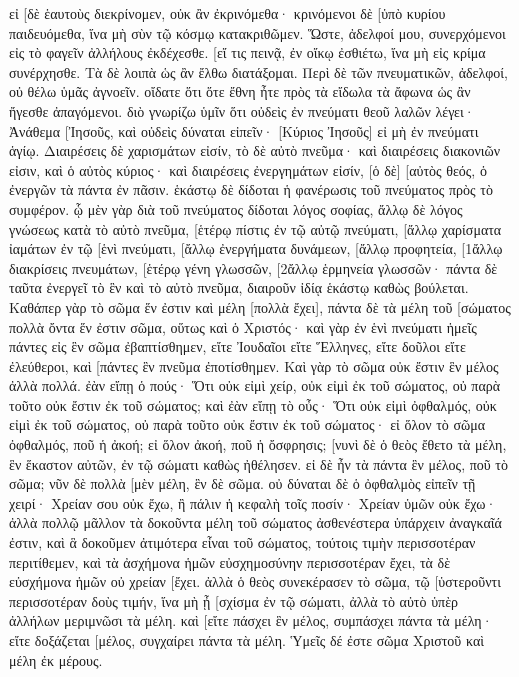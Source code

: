 εἰ [δὲ ἑαυτοὺς διεκρίνομεν, οὐκ ἂν ἐκρινόμεθα· 
κρινόμενοι δὲ [ὑπὸ κυρίου παιδευόμεθα, ἵνα μὴ σὺν τῷ κόσμῳ κατακριθῶμεν. 
Ὥστε, ἀδελφοί μου, συνερχόμενοι εἰς τὸ φαγεῖν ἀλλήλους ἐκδέχεσθε. 
[εἴ τις πεινᾷ, ἐν οἴκῳ ἐσθιέτω, ἵνα μὴ εἰς κρίμα συνέρχησθε. Τὰ δὲ λοιπὰ ὡς ἂν ἔλθω διατάξομαι. 
Περὶ δὲ τῶν πνευματικῶν, ἀδελφοί, οὐ θέλω ὑμᾶς ἀγνοεῖν. 
οἴδατε ὅτι ὅτε ἔθνη ἦτε πρὸς τὰ εἴδωλα τὰ ἄφωνα ὡς ἂν ἤγεσθε ἀπαγόμενοι. 
διὸ γνωρίζω ὑμῖν ὅτι οὐδεὶς ἐν πνεύματι θεοῦ λαλῶν λέγει· Ἀνάθεμα [Ἰησοῦς, καὶ οὐδεὶς δύναται εἰπεῖν· [Κύριος Ἰησοῦς] εἰ μὴ ἐν πνεύματι ἁγίῳ. 
Διαιρέσεις δὲ χαρισμάτων εἰσίν, τὸ δὲ αὐτὸ πνεῦμα· 
καὶ διαιρέσεις διακονιῶν εἰσιν, καὶ ὁ αὐτὸς κύριος· 
καὶ διαιρέσεις ἐνεργημάτων εἰσίν, [ὁ δὲ] [αὐτὸς θεός, ὁ ἐνεργῶν τὰ πάντα ἐν πᾶσιν. 
ἑκάστῳ δὲ δίδοται ἡ φανέρωσις τοῦ πνεύματος πρὸς τὸ συμφέρον. 
ᾧ μὲν γὰρ διὰ τοῦ πνεύματος δίδοται λόγος σοφίας, ἄλλῳ δὲ λόγος γνώσεως κατὰ τὸ αὐτὸ πνεῦμα, 
[ἑτέρῳ πίστις ἐν τῷ αὐτῷ πνεύματι, [ἄλλῳ χαρίσματα ἰαμάτων ἐν τῷ [ἑνὶ πνεύματι, 
[ἄλλῳ ἐνεργήματα δυνάμεων, [ἄλλῳ προφητεία, [1ἄλλῳ διακρίσεις πνευμάτων, [ἑτέρῳ γένη γλωσσῶν, [2ἄλλῳ ἑρμηνεία γλωσσῶν· 
πάντα δὲ ταῦτα ἐνεργεῖ τὸ ἓν καὶ τὸ αὐτὸ πνεῦμα, διαιροῦν ἰδίᾳ ἑκάστῳ καθὼς βούλεται. 
Καθάπερ γὰρ τὸ σῶμα ἕν ἐστιν καὶ μέλη [πολλὰ ἔχει], πάντα δὲ τὰ μέλη τοῦ [σώματος πολλὰ ὄντα ἕν ἐστιν σῶμα, οὕτως καὶ ὁ Χριστός· 
καὶ γὰρ ἐν ἑνὶ πνεύματι ἡμεῖς πάντες εἰς ἓν σῶμα ἐβαπτίσθημεν, εἴτε Ἰουδαῖοι εἴτε Ἕλληνες, εἴτε δοῦλοι εἴτε ἐλεύθεροι, καὶ [πάντες ἓν πνεῦμα ἐποτίσθημεν. 
Καὶ γὰρ τὸ σῶμα οὐκ ἔστιν ἓν μέλος ἀλλὰ πολλά. 
ἐὰν εἴπῃ ὁ πούς· Ὅτι οὐκ εἰμὶ χείρ, οὐκ εἰμὶ ἐκ τοῦ σώματος, οὐ παρὰ τοῦτο οὐκ ἔστιν ἐκ τοῦ σώματος; 
καὶ ἐὰν εἴπῃ τὸ οὖς· Ὅτι οὐκ εἰμὶ ὀφθαλμός, οὐκ εἰμὶ ἐκ τοῦ σώματος, οὐ παρὰ τοῦτο οὐκ ἔστιν ἐκ τοῦ σώματος· 
εἰ ὅλον τὸ σῶμα ὀφθαλμός, ποῦ ἡ ἀκοή; εἰ ὅλον ἀκοή, ποῦ ἡ ὄσφρησις; 
[νυνὶ δὲ ὁ θεὸς ἔθετο τὰ μέλη, ἓν ἕκαστον αὐτῶν, ἐν τῷ σώματι καθὼς ἠθέλησεν. 
εἰ δὲ ἦν τὰ πάντα ἓν μέλος, ποῦ τὸ σῶμα; 
νῦν δὲ πολλὰ [μὲν μέλη, ἓν δὲ σῶμα. 
οὐ δύναται δὲ ὁ ὀφθαλμὸς εἰπεῖν τῇ χειρί· Χρείαν σου οὐκ ἔχω, ἢ πάλιν ἡ κεφαλὴ τοῖς ποσίν· Χρείαν ὑμῶν οὐκ ἔχω· 
ἀλλὰ πολλῷ μᾶλλον τὰ δοκοῦντα μέλη τοῦ σώματος ἀσθενέστερα ὑπάρχειν ἀναγκαῖά ἐστιν, 
καὶ ἃ δοκοῦμεν ἀτιμότερα εἶναι τοῦ σώματος, τούτοις τιμὴν περισσοτέραν περιτίθεμεν, καὶ τὰ ἀσχήμονα ἡμῶν εὐσχημοσύνην περισσοτέραν ἔχει, 
τὰ δὲ εὐσχήμονα ἡμῶν οὐ χρείαν [ἔχει. ἀλλὰ ὁ θεὸς συνεκέρασεν τὸ σῶμα, τῷ [ὑστεροῦντι περισσοτέραν δοὺς τιμήν, 
ἵνα μὴ ᾖ [σχίσμα ἐν τῷ σώματι, ἀλλὰ τὸ αὐτὸ ὑπὲρ ἀλλήλων μεριμνῶσι τὰ μέλη. 
καὶ [εἴτε πάσχει ἓν μέλος, συμπάσχει πάντα τὰ μέλη· εἴτε δοξάζεται [μέλος, συγχαίρει πάντα τὰ μέλη. 
Ὑμεῖς δέ ἐστε σῶμα Χριστοῦ καὶ μέλη ἐκ μέρους. 
